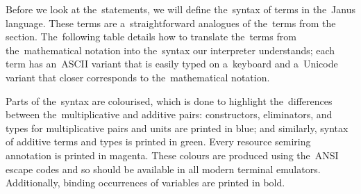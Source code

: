 Before we look at the~statements, we will define the~syntax of terms in
the~Janus language. These terms are a~straightforward analogues of
the~terms from the~ section. The~following table
details how to translate the~terms from the~mathematical notation into
the~syntax our interpreter understands; each term has an~ASCII variant that
is easily typed on a~keyboard and a~Unicode variant that closer corresponds to
the~mathematical notation.

Parts of the~syntax are colourised, which is done to highlight the~differences
between the~multiplicative and additive pairs: constructors, eliminators, and
types for multiplicative pairs and units are printed in
blue; and similarly, syntax of additive terms and types
is printed in green. Every resource semiring annotation is
printed in magenta. These colours are produced using
the~ANSI escape codes and so should be available in all modern terminal
emulators. Additionally, binding occurrences of variables are printed in bold.

